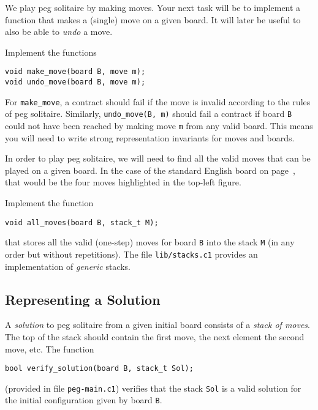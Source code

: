 \documentclass[12pt]{exam}
\begin{document}
\bigskip

We play peg solitaire by making moves.  Your next task will be to
implement a function that makes a (single) move on a given board.  It
will later be useful to also be able to \emph{undo} a move.

\begin{task}[2]
Implement the functions
\begin{lstlisting}
void make_move(board B, move m);
void undo_move(board B, move m);
\end{lstlisting}
For \lstinline'make_move', a contract should fail if the move is
invalid according to the rules of peg solitaire.  Similarly,
\lstinline'undo_move(B, m)' should fail a contract if board
\lstinline'B' could not have been reached by making move \lstinline'm'
from any valid board.  This means you will need to write strong
representation invariants for moves and boards.
\end{task}

\bigskip

In order to play peg solitaire, we will need to find all the valid
moves that can be played on a given board.  In the case of the
standard English board on page~\pageref{sec:peg}, that would be the
four moves highlighted in the top-left figure.

\begin{task}[3]
Implement the function
\begin{lstlisting}
void all_moves(board B, stack_t M);
\end{lstlisting}
that stores all the valid (one-step) moves for board \lstinline'B' into
the stack \lstinline'M' (in any order but without repetitions).  The
file \lstinline'lib/stacks.c1' provides an implementation of
\emph{generic} stacks.
\end{task}


\subsection{Representing a Solution}

A \emph{solution} to peg solitaire from a given initial board
consists of a \emph{stack of moves}.  The top of the stack should
contain the first move, the next element the second move, etc.  The
function
\begin{lstlisting}
bool verify_solution(board B, stack_t Sol);
\end{lstlisting}
(provided in file \lstinline'peg-main.c1') verifies that the stack
\lstinline'Sol' is a valid solution for the initial configuration
given by board \lstinline'B'.
\end{document}
